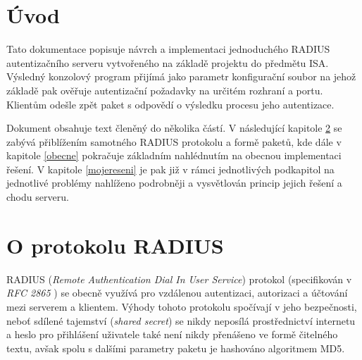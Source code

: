 \documentclass[12pt,a4paper,titlepage,final]{article}
\begin{document}

\def\author{David Koňař}
\def\email{xkonar07@stud.fit.vutbr.cz}
\def\projname{Jednoduchý autentizační server}



\pagestyle{plain}
\setcounter{page}{1}
\tableofcontents

\newpage
\pagestyle{plain}
\setcounter{page}{1}



\section{Úvod} \label{uvod}

Tato dokumentace popisuje návrch a implementaci jednoduchého RADIUS autentizačního serveru vytvořeného na základě projektu do předmětu ISA. Výsledný konzolový program přijímá jako parametr konfigurační soubor na jehož základě pak ověřuje autentizační požadavky na určitém rozhraní a portu. Klientům odešle zpět paket s odpovědí o výsledku procesu jeho autentizace.

Dokument obsahuje text členěný do několika částí. V následující kapitole \ref{oRadius} se zabývá přiblížením samotného RADIUS protokolu a formě paketů, kde dále v kapitole \ref{obecne} pokračuje základním nahlédnutím na obecnou implementaci řešení. V kapitole \ref{mojereseni} je pak již v rámci jednotlivých podkapitol na jednotlivé problémy nahlíženo podrobněji a vysvětlován princip jejich řešení a chodu serveru.
\newpage




\section{O protokolu RADIUS} \label{oRadius}
RADIUS (\textit{Remote Authentication Dial In User Service}) protokol (specifikován v \textit{RFC 2865} \cite{rfc2865}) se obecně využívá pro vzdálenou autentizaci, autorizaci a účtování mezi serverem a klientem. Výhody tohoto protokolu spočívají v jeho bezpečnosti, neboť sdílené tajemství (\textit{shared secret}) se nikdy neposílá prostřednictví internetu a heslo pro přihlášení uživatele také není nikdy přenášeno ve formě čitelného textu, avšak spolu s dalšími parametry paketu je hashováno algoritmem MD5.
\end{document}
